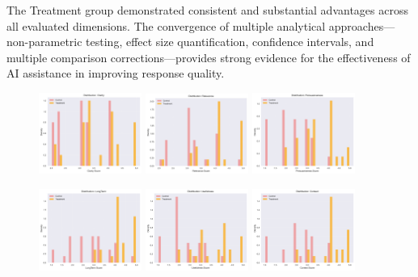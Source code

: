 The Treatment group demonstrated consistent and substantial advantages across all evaluated dimensions. The convergence of multiple analytical approaches—non-parametric testing, effect size quantification, confidence intervals, and multiple comparison corrections—provides strong evidence for the effectiveness of AI assistance in improving response quality.
\begin{figure}[t]
    \centering
    \includegraphics[width=0.3\textwidth]{plots/distribution_clarity.png} \hfill
    \includegraphics[width=0.3\textwidth]{plots/distribution_relevance.png} \hfill
    \includegraphics[width=0.3\textwidth]{plots/distribution_persuasiveness.png}
    
    \vspace{1em} %

    \includegraphics[width=0.3\textwidth]{plots/distribution_longterm.png} \hfill
    \includegraphics[width=0.3\textwidth]{plots/distribution_usefulness.png} \hfill
    \includegraphics[width=0.3\textwidth]{plots/distribution_context.png}


\end{figure}
